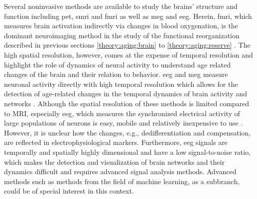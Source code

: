 Several noninvasive methods are available to study the brains' structure and function including \gls{pet}, \gls{smri} and \gls{fmri} as well as \gls{meg} and \gls{eeg}. Herein, \Gls{fmri}, which measures brain activation indirectly via changes in blood oxygenation, is the dominant neuroimaging method in the study of the functional reorganization described in previous sections \ref{theory:aging:brain} to \ref{theory:aging:reserve} \cite{Reuter-Lorenz2010}. The high spatial resolution, however, comes at the expense of temporal resolution and \citeauthor{Courtney2021} \cite{Courtney2021} highlight the role of dynamics of neural activity to understand age related changes of the brain and their relation to behavior. \Gls{eeg} and \gls{meg} measure neuronal activity directly with high temporal resolution which allows for the detection of age-related changes in the temporal dynamics of brain activity and networks \cite{Courtney2021}. Although the spatial resolution of these methods is limited compared to MRI, especially \gls{eeg}, which measures the synchronized electrical activity of large populations of neurons is easy, mobile and relatively inexpensive to use \cite{CohenX2017}. However, it is unclear how the changes, e.g., dedifferentiation and compensation, are reflected in electrophysiological markers. Furthermore, \gls{eeg} signals are temporally and spatially highly dimensional and have a low signal-to-noise ratio, which makes the detection and visualization of brain networks and their dynamics difficult and requires advanced signal analysis methods. Advanced methods such as methods from the field of machine learning, as a subbranch, could be of special interest in this context.